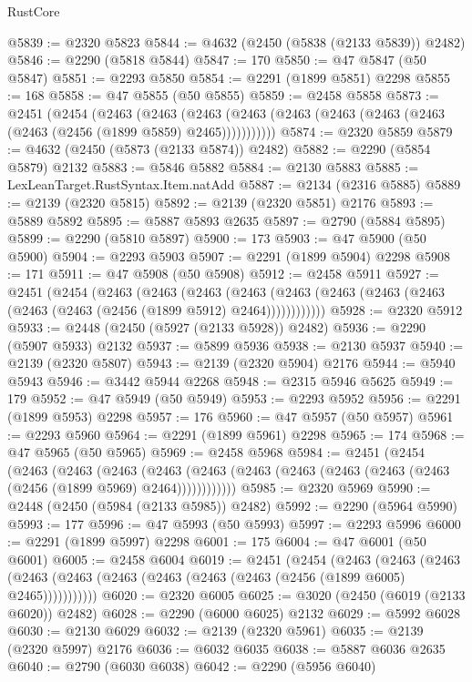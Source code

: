 \begin{lexlean}{RustCore}
\begin{coremodule}
@5839 := @2320 @5823
@5844 := @4632 (@2450 (@5838 (@2133 @5839)) @2482)
@5846 := @2290 (@5818 @5844)
@5847 := 170
@5850 := @47 @5847 (@50 @5847)
@5851 := @2293 @5850
@5854 := @2291 (@1899 @5851) @2298
@5855 := 168
@5858 := @47 @5855 (@50 @5855)
@5859 := @2458 @5858
@5873 := @2451
    (@2454
      (@2463
        (@2463
          (@2463 (@2463 (@2463 (@2463 (@2463 (@2463 (@2463 (@2456 (@1899 @5859) @2465)))))))))))
@5874 := @2320 @5859
@5879 := @4632 (@2450 (@5873 (@2133 @5874)) @2482)
@5882 := @2290 (@5854 @5879) @2132
@5883 := @5846 @5882
@5884 := @2130 @5883
@5885 := LexLeanTarget.RustSyntax.Item.natAdd
@5887 := @2134 (@2316 @5885)
@5889 := @2139 (@2320 @5815)
@5892 := @2139 (@2320 @5851) @2176
@5893 := @5889 @5892
@5895 := @5887 @5893 @2635
@5897 := @2790 (@5884 @5895)
@5899 := @2290 (@5810 @5897)
@5900 := 173
@5903 := @47 @5900 (@50 @5900)
@5904 := @2293 @5903
@5907 := @2291 (@1899 @5904) @2298
@5908 := 171
@5911 := @47 @5908 (@50 @5908)
@5912 := @2458 @5911
@5927 := @2451
    (@2454
      (@2463
        (@2463
          (@2463
            (@2463 (@2463 (@2463 (@2463 (@2463 (@2463 (@2463 (@2456 (@1899 @5912) @2464))))))))))))
@5928 := @2320 @5912
@5933 := @2448 (@2450 (@5927 (@2133 @5928)) @2482)
@5936 := @2290 (@5907 @5933) @2132
@5937 := @5899 @5936
@5938 := @2130 @5937
@5940 := @2139 (@2320 @5807)
@5943 := @2139 (@2320 @5904) @2176
@5944 := @5940 @5943
@5946 := @3442 @5944 @2268
@5948 := @2315 @5946 @5625
@5949 := 179
@5952 := @47 @5949 (@50 @5949)
@5953 := @2293 @5952
@5956 := @2291 (@1899 @5953) @2298
@5957 := 176
@5960 := @47 @5957 (@50 @5957)
@5961 := @2293 @5960
@5964 := @2291 (@1899 @5961) @2298
@5965 := 174
@5968 := @47 @5965 (@50 @5965)
@5969 := @2458 @5968
@5984 := @2451
    (@2454
      (@2463
        (@2463
          (@2463
            (@2463 (@2463 (@2463 (@2463 (@2463 (@2463 (@2463 (@2456 (@1899 @5969) @2464))))))))))))
@5985 := @2320 @5969
@5990 := @2448 (@2450 (@5984 (@2133 @5985)) @2482)
@5992 := @2290 (@5964 @5990)
@5993 := 177
@5996 := @47 @5993 (@50 @5993)
@5997 := @2293 @5996
@6000 := @2291 (@1899 @5997) @2298
@6001 := 175
@6004 := @47 @6001 (@50 @6001)
@6005 := @2458 @6004
@6019 := @2451
    (@2454
      (@2463
        (@2463
          (@2463 (@2463 (@2463 (@2463 (@2463 (@2463 (@2463 (@2456 (@1899 @6005) @2465)))))))))))
@6020 := @2320 @6005
@6025 := @3020 (@2450 (@6019 (@2133 @6020)) @2482)
@6028 := @2290 (@6000 @6025) @2132
@6029 := @5992 @6028
@6030 := @2130 @6029
@6032 := @2139 (@2320 @5961)
@6035 := @2139 (@2320 @5997) @2176
@6036 := @6032 @6035
@6038 := @5887 @6036 @2635
@6040 := @2790 (@6030 @6038)
@6042 := @2290 (@5956 @6040)

\end{coremodule}
\end{lexlean}
